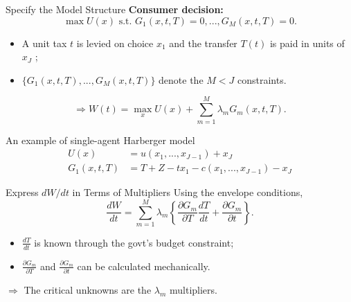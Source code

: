 \documentclass{beamer}
\begin{document}
\begin{frame}[label=ex_harberger]{Specify the Model Structure}
	\textbf{Consumer decision:}
	\begin{equation}
		\max U(x)\mbox{ s.t. } G_1(x,t,T) = 0,...,G_M(x,t,T) = 0.
	\end{equation}

	\begin{itemize}
		\item A unit tax $t$ is levied on choice $x_1$ and the transfer $T(t)$ is paid in units of $x_J$ ;
		\item $\{G_1(x,t,T),...,G_M(x,t,T)\}$ denote the $M<J$ constraints.
	\end{itemize}
	\begin{equation}
		\Rightarrow W(t) = \max_x U(x) + \sum_{m=1}^M\lambda_mG_m(x,t,T).
	\end{equation}
	
	\begin{block}{An example of single-agent Harberger model \hyperlink{ex_hgb_back}{}}
		\begin{equation}\nonumber
			\begin{aligned}
				U(x) &= u(x_1,...,x_{J-1}) + x_J \\
				G_1(x,t,T) &= T + Z - tx_1 - c(x_1,...,x_{J-1}) - x_J
			\end{aligned}
		\end{equation}
	\end{block}
\end{frame}
\begin{frame}{Express $dW/dt$ in Terms of Multipliers}
	Using the envelope conditions,
	\begin{equation}\label{foc_eq14}
		\frac{dW}{dt} = \sum_{m=1}^M\lambda_m\left\{\frac{\partial G_m}{\partial T}\frac{dT}{dt}+\frac{\partial G_m}{\partial t}\right\}.
	\end{equation}

	\begin{itemize}
		\item $\frac{dT}{dt}$ is known through the govt's budget constraint;
		\item $\frac{\partial G_m}{\partial T}$ and $\frac{\partial G_m}{\partial t}$ can be calculated mechanically.
	\end{itemize}
	\medskip

	$\Rightarrow$ The critical unknowns are the $\lambda_m$ multipliers.
\end{frame}
\end{document}
